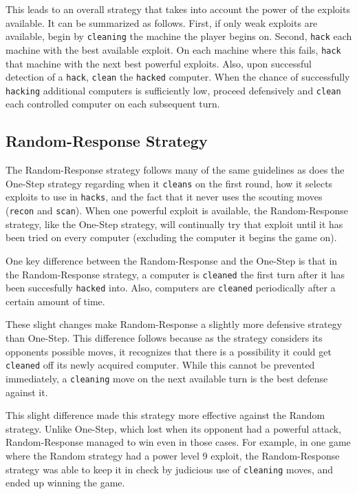 This leads to an overall strategy that takes into account the power of the exploits available. 
It can be summarized as follows. 
First, if only weak exploits are available, begin by {\tt cleaning} the machine the player begins on.  
Second, {\tt hack} each machine with the best available exploit. 
On each machine where this fails, {\tt hack} that machine with the next best powerful exploits. 
Also, upon successful detection of a {\tt hack}, {\tt clean} the {\tt hacked} computer.
When the chance of successfully {\tt hacking} additional computers is sufficiently low, proceed defensively and {\tt clean} each controlled computer on each subsequent turn.




\subsection{Random-Response Strategy}
The Random-Response strategy follows many of the same guidelines as does the One-Step strategy regarding when it {\tt cleans} on the first round, how it selects exploits to use in {\tt hacks}, and the fact that it never uses the scouting moves ({\tt recon} and {\tt scan}).
When one powerful exploit is available, the Random-Response strategy, like the One-Step strategy, will continually try that exploit until it has been tried on every computer (excluding the computer it begins the game on). 

One key difference between the Random-Response and the One-Step is that in the Random-Response strategy, a computer is {\tt cleaned} the first turn after it has been succesfully {\tt hacked} into. 
Also, computers are {\tt cleaned} periodically after a certain amount of time. 

These slight changes make Random-Response a slightly more defensive strategy than One-Step.
This difference follows because as the strategy considers its opponents possible moves, it recognizes that there is a possibility it could get {\tt cleaned} off its newly acquired computer.
While this cannot be prevented immediately, a {\tt cleaning} move on the next available turn is the best defense against it.

This slight difference made this strategy more effective against the Random strategy.
Unlike One-Step, which lost when its opponent had a powerful attack, Random-Response managed to win even in those cases.
For example, in one game where the Random strategy had a power level 9 exploit, the Random-Response strategy was able to keep it in check by judicious use of {\tt cleaning} moves, and ended up winning the game.

